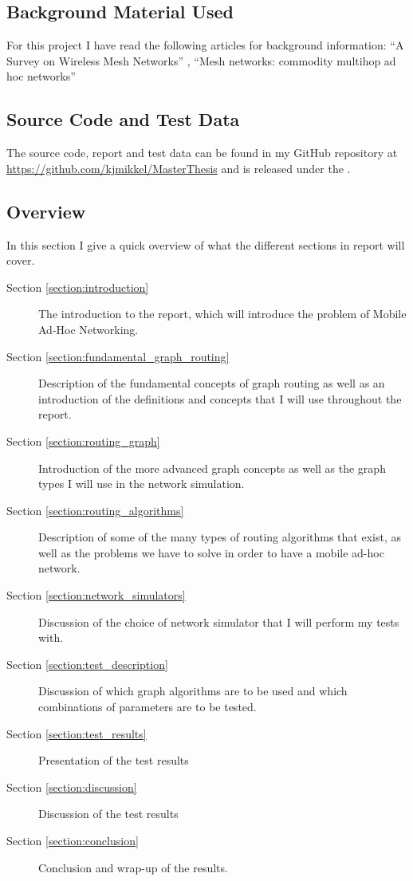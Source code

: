 \subsection{Background Material Used}
For this project I have read the following articles for background information: ``A Survey on Wireless Mesh Networks'' \cite{martinWirelessSurvey}, ``Mesh networks: commodity multihop ad hoc networks''\cite{martinMeshnetwork} 

\subsection{Source Code and Test Data}
\label{section:source_code}
The source code, report and test data can be found in my GitHub repository at \url{https://github.com/kjmikkel/MasterThesis} and is released under the .

\subsection{Overview}
In this section I give a quick overview of what the different sections in report will cover.
\begin{description}
\item[Section \ref{section:introduction}] The introduction to the report, which will introduce the problem of Mobile Ad-Hoc Networking.
\item[Section \ref{section:fundamental_graph_routing}] Description of the fundamental concepts of graph routing as well as an introduction of the definitions and concepts that I will use throughout the report.
\item[Section \ref{section:routing_graph}] Introduction of the more advanced graph concepts as well as the graph types I will use in the network simulation.
\item[Section \ref{section:routing_algorithms}] Description of some of the many types of routing algorithms that exist, as well as the problems we have to solve in order to have a mobile ad-hoc network.
\item[Section \ref{section:network_simulators}] Discussion of the choice of network simulator that I will perform my tests with. 
\item[Section \ref{section:test_description}] Discussion of which graph algorithms are to be used and which combinations of parameters are to be tested.
\item[Section \ref{section:test_results}] Presentation of the test results
\item[Section \ref{section:discussion}] Discussion of the test results
\item[Section \ref{section:conclusion}] Conclusion and wrap-up of the results.
\end{description}
